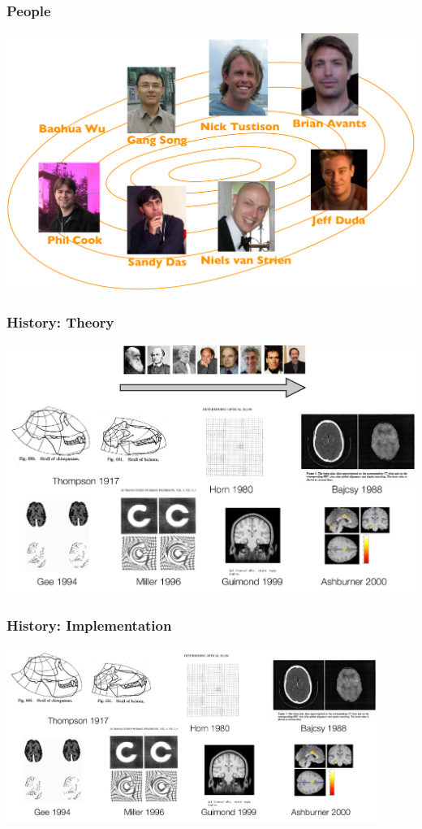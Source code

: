 \documentclass[18pt]{beamer}
\begin{document}
\begin{frame}
\frametitle{People}
\includegraphics[width=\paperwidth]{../figures/ants_contributors.pdf}
\end{frame}

\begin{frame}
\frametitle{History: Theory}
\includegraphics[width=\paperwidth]{../figures/ants_history_t.pdf}
\end{frame}

\begin{frame}
\frametitle{History: Implementation}
\includegraphics[width=4.75in]{../figures/ants_history.pdf}
\end{frame}
\end{document}
